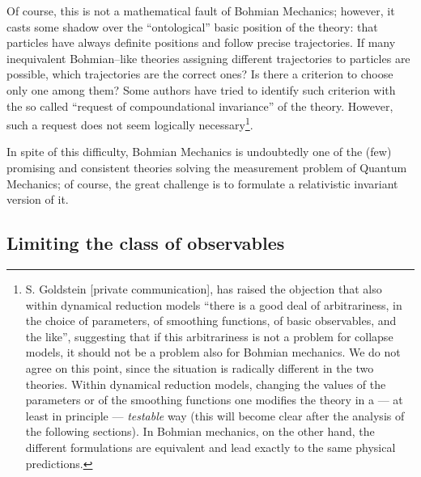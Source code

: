 \documentclass[12pt]{article}
\begin{document}
Of course, this is not a mathematical fault of Bohmian Mechanics;
however, it casts some shadow over the ``ontological'' basic
position of the theory: that particles have always definite
positions and follow precise trajectories. If many inequivalent
Bohmian--like theories assigning different trajectories to
particles are possible, which trajectories are the correct ones?
Is there a criterion to choose only one among them? Some authors
\cite{rim1} have tried to identify such criterion with the so
called ``request of compoundational invariance'' of the theory.
However, such a request does not seem logically
necessary\footnote{S. Goldstein [private communication], has
raised the objection that also within dynamical reduction models
``there is a good deal of arbitrariness, in the choice of parameters,
of smoothing functions, of basic observables, and the like'',
suggesting that if this arbitrariness is not a problem for
collapse models, it should not be a problem also for Bohmian
mechanics. We do not agree on this point, since
the situation is radically different in the two theories. Within dynamical
reduction models, changing the values of the parameters or of
the smoothing functions one modifies the theory in a --- at least
in principle --- {\it testable} way (this will become clear after
the analysis of the following sections). In Bohmian mechanics, on
the other hand, the different formulations are equivalent and lead
exactly to the same physical predictions.}.

In spite of this difficulty, Bohmian Mechanics is undoubtedly one
of the (few) promising and consistent theories solving the
measurement problem of Quantum Mechanics; of course, the great
challenge is to formulate a relativistic invariant version of it.


\subsection{Limiting the class of observables} \label{sec33}
\end{document}
